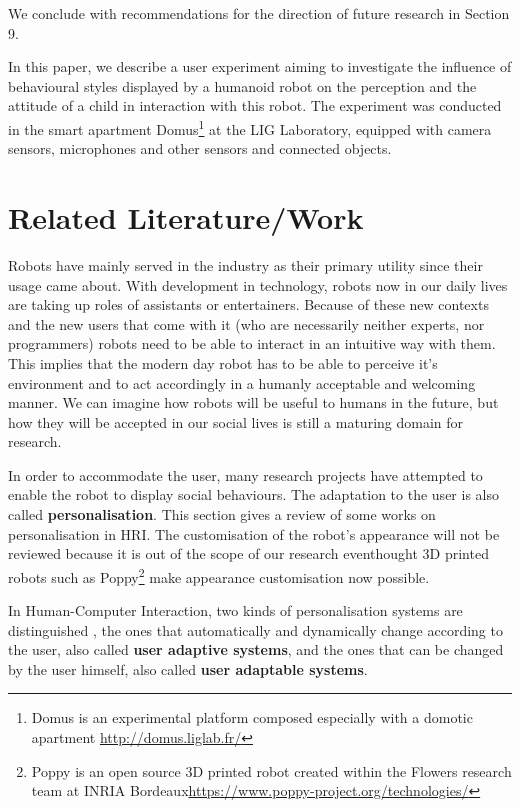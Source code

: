 \documentclass[a4paper,twocolumn]{svjour3}
\begin{document}
We conclude with recommendations for the direction of future research in Section 9.

In this paper, we describe a user experiment aiming to investigate the influence of behavioural styles displayed by a humanoid robot on the perception and the attitude of a child in interaction with this robot. 
The experiment was conducted in the smart apartment Domus\footnote{Domus is an experimental platform composed especially with a domotic apartment \url{http://domus.liglab.fr/}} at the LIG Laboratory, equipped with camera sensors, microphones and other sensors and connected objects. 



\section{Related Literature/Work}
Robots have mainly served in the industry as their primary utility since their usage came about.
With development in technology, robots now in our daily lives are taking up roles of assistants or entertainers. 
Because of these new contexts and the new users that come with it (who are necessarily neither experts, nor programmers) robots need to be able to interact in an intuitive way with them. 
This implies that the modern day robot has to be able to perceive it's environment and to act accordingly in a humanly acceptable and welcoming manner. 
We can imagine how robots will be useful to humans in the future, but how they will be accepted in our social lives is still a maturing domain for research.


In order to accommodate the user, many research projects have attempted to enable the robot to display social behaviours.
The adaptation to the user is also called \textbf{personalisation}.
This section gives a review of some works on personalisation in HRI.
The customisation of the robot's appearance will not be reviewed because it is out of the scope of our research eventhought 3D printed robots such as Poppy\footnote{Poppy is an open source 3D printed robot created within the Flowers research team at INRIA Bordeaux\url{https://www.poppy-project.org/technologies/}} make appearance customisation now possible.  

In Human-Computer Interaction, two kinds of personalisation systems are distinguished \cite{Fischer2001,Oppermann1997}, the ones that automatically and dynamically change according to the user, also called \textbf{user adaptive systems}, and the ones that can be changed by the user himself, also called \textbf{user adaptable systems}. 
\end{document}
